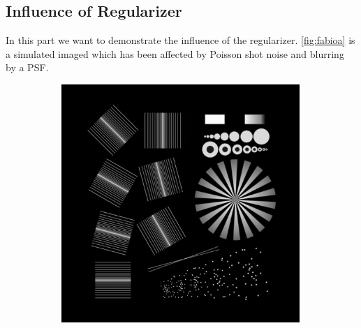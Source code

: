 \documentclass{juliacon}
\begin{document}
    \subsection{Influence of Regularizer}
        In this part we want to demonstrate the influence of the regularizer.
        \autoref{fig:fabioa} is a simulated imaged which has been affected by Poisson shot noise and blurring by a PSF.
        \begin{figure}[h]
            \begin{subfigure}[b]{.16\textwidth}
                \centering
                \includegraphics[width=0.99\textwidth]{figures/resolution_test_512.png}
                \caption{}
                \label{fig:gt}
            \end{subfigure}%
            \begin{subfigure}[b]{.16\textwidth}
                \centering

\end{subfigure}
\end{figure}
\end{document}
